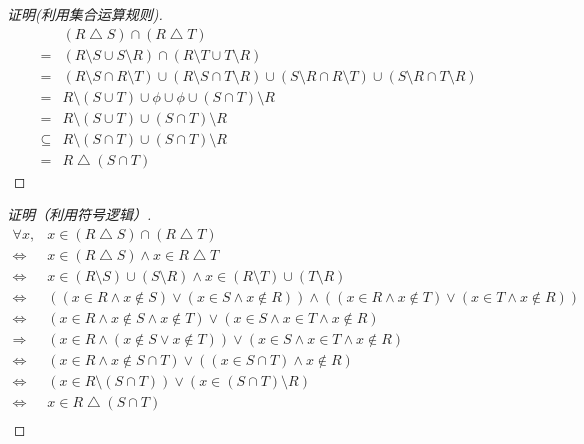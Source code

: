 \documentclass{article}
\begin{document}
\begin{CJK}{UTF8}{gbsn}
\begin{proof}[证明(利用集合运算规则)]
  \begin{equation*}
    \begin{split}
  &(R\bigtriangleup S)\cap (R\bigtriangleup T)\\
  =&(R\setminus S \cup S\setminus R) \cap (R\setminus T \cup T\setminus R)\\
  =&(R\setminus S \cap R\setminus T)\cup (R\setminus S\cap T\setminus R)\cup (S\setminus R\cap R\setminus T)\cup (S\setminus R\cap T\setminus R)\\
  =&R\setminus (S\cup T)\cup \phi \cup \phi \cup (S\cap T)\setminus R\\
  =&R\setminus (S\cup T)\cup  (S\cap T)\setminus R\\
  \subseteq &R\setminus (S\cap T) \cup (S\cap T)\setminus R\\
  =&R\bigtriangleup (S\cap T)
\end{split}
\end{equation*}
\end{proof}
\begin{proof}[证明（利用符号逻辑）]
    \begin{equation*}
    \begin{split}
      \forall x, &x \in (R\bigtriangleup S)\cap (R\bigtriangleup T) \\
      \Leftrightarrow& x \in (R\bigtriangleup S) \land x\in R\bigtriangleup T\\
      \Leftrightarrow& x \in (R\setminus S)\cup (S\setminus R) \land x\in (R\setminus T)\cup (T\setminus R)\\
      \Leftrightarrow& ((x \in R \land x\notin S) \lor (x \in S \land x \notin R))\land ((x\in R \land x\notin T)\lor (x\in T \land x \notin R))\\
      \Leftrightarrow& (x \in R \land x \notin S  \land x\notin T) \lor (x \in S \land x \in T \land x\notin R)\\
      \Rightarrow & (x \in R \land (x\notin S \lor x\notin T)) \lor (x \in S \land x \in T \land x\notin R)\\
      \Leftrightarrow& (x \in R \land x \notin S\cap T)\lor ((x\in S\cap T)\land x\notin R)\\
      \Leftrightarrow& (x \in R  \setminus (S\cap T))\lor (x\in (S\cap T)\setminus R)\\
      \Leftrightarrow& x \in R  \bigtriangleup (S\cap T)\\      
    \end{split}
  \end{equation*}

\end{proof}


\end{CJK}
\end{document}

